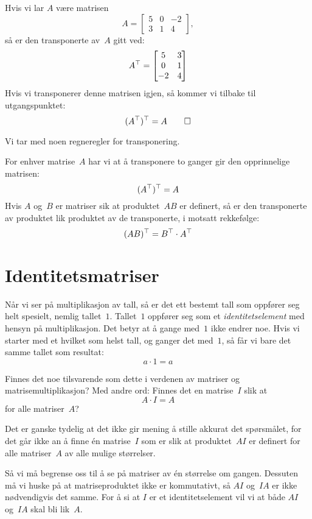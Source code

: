 \begin{ex}
Hvis vi lar $A$ være matrisen
\[
A =
\begin{bmatrix}
5 & 0 & -2 \\
3 & 1 &  4
\end{bmatrix},
\]
så er den transponerte av~$A$ gitt ved:
\[
A^\top =
\begin{bmatrix}
 5 & 3 \\
 0 & 1 \\
-2 & 4
\end{bmatrix}
\]
Hvis vi transponerer denne matrisen igjen, så kommer vi tilbake til
utgangspunktet:
\[
(A^\top)^\top = A\qedhere
\]
\end{ex}

Vi tar med noen regneregler for transponering.

\begin{thm}
\label{thm:tr}
For enhver matrise~$A$ har vi at å transponere to ganger gir den
opprinnelige matrisen:
\[
(A^\top)^\top = A
\]
Hvis $A$ og~$B$ er matriser sik at produktet~$AB$ er definert, så er
den transponerte av produktet lik produktet av de transponerte, i
motsatt rekkefølge:
\[
(AB)^\top = B^\top \cdot A^\top
\]
\end{thm}


\section*{Identitetsmatriser}

Når vi ser på multiplikasjon av tall, så er det ett bestemt tall som
oppfører seg helt spesielt, nemlig tallet~$1$.  Tallet~$1$ oppfører
seg som et \emph{identitetselement} med hensyn på multiplikasjon.  Det
betyr at å gange med~$1$ ikke endrer noe.  Hvis vi starter med et
hvilket som helst tall, og ganger det med~$1$, så får vi bare det
samme tallet som resultat:
\[
a \cdot 1 = a
\]

Finnes det noe tilsvarende som dette i verdenen av matriser og
matrisemultiplikasjon?  Med andre ord: Finnes det en matrise~$I$ slik
at
\[
A \cdot I = A
\]
for alle matriser~$A$?

Det er ganske tydelig at det ikke gir mening å stille akkurat det
spørsmålet, for det går ikke an å finne én matrise~$I$ som er slik at
produktet~$AI$ er definert for alle matriser~$A$ av alle mulige
størrelser.

Så vi må begrense oss til å se på matriser av én størrelse om gangen.
Dessuten må vi huske på at matriseproduktet ikke er kommutativt, så
$AI$ og~$IA$ er ikke nødvendigvis det samme.  For å si at $I$ er et
identitetselement vil vi at både $AI$ og~$IA$ skal bli lik~$A$.

